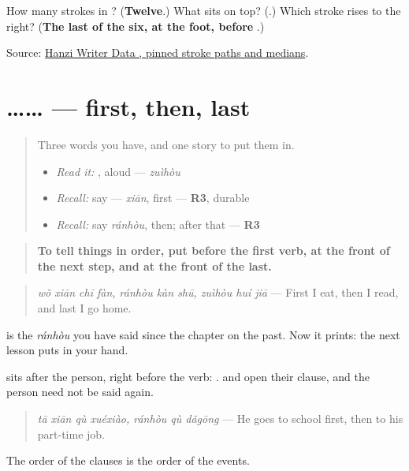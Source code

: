 \begin{tcolorbox}[breakable,colback=teal!4,colframe=teal!35!black,title={Before you move on}]
How many strokes in ? (\textbf{Twelve}.) What sits on top? (\textbf{}.) Which stroke rises to the right? (\textbf{The last of the six, at the foot, before }.)

Source: \href{https://raw.githubusercontent.com/chanind/hanzi-writer-data/68d10a4b21150cae5e1ebbd223eed289cf32d90c/data/\%E6\%9C\%80.json}{Hanzi Writer Data , pinned stroke paths and medians}.
\end{tcolorbox}
\section[\texorpdfstring{\zh{先}…\zh{然后}…\zh{最后} (xiān … ránhòu … zuìhòu)}{先…然后…最后 (xiān … ránhòu … zuìhòu)}]{…… — first, then, last}

\label{lesson:ZH-C278-sequence}



\begin{quote}
Three words you have, and one story to put them in.

\begin{itemize}
\raggedright
  \item \emph{Read it:} , aloud — \emph{zuìhòu}
  \item \emph{Recall:} say  — \emph{xiān}, first — \textbf{R3}, durable
  \item \emph{Recall:} say \emph{ránhòu}, then; after that — \textbf{R3}
\end{itemize}
\end{quote}

\begin{grammarlens}[title={Grammar Lens: \zh{先}, \zh{然后}, \zh{最后} — first, then, last}]
\begin{quote}
\textbf{To tell things in order, put  before the first verb,  at the front of the next step, and  at the front of the last.}
\end{quote}

\begin{quote}
\textbf{  } \emph{wǒ xiān chī fàn, ránhòu kàn shū, zuìhòu huí jiā} — First I eat, then I read, and last I go home.
\end{quote}

 is the \emph{ránhòu} you have said since the chapter on the past. Now it prints: the next lesson puts  in your hand.

 sits after the person, right before the verb: .  and  open their clause, and the person need not be said again.

\begin{quote}
\textbf{ } \emph{tā xiān qù xuéxiào, ránhòu qù dǎgōng} — He goes to school first, then to his part-time job.
\end{quote}

The order of the clauses is the order of the events.
\end{grammarlens}

